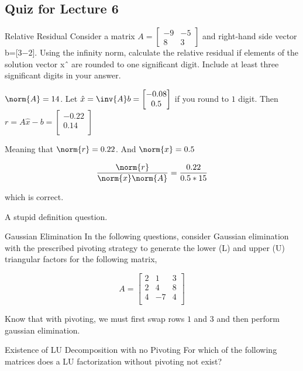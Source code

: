\documentclass[../main.tex]{subfiles}
\begin{document}
\subsection{Quiz for Lecture 6}
Relative Residual
Consider a matrix $A=\begin{bmatrix} −9 & -5 \\ 8 & 3 \end{bmatrix}$ and right-hand side vector b=[3−2]. Using the infinity norm, calculate the relative residual if elements of the solution vector xˆ are rounded to one significant digit. Include at least three significant digits in your answer.

\begin{solution}
    $\norm{A} = 14$. Let $\hat{x} = \inv{A}b = \begin{bmatrix}
        -0.08 \\ 0.5
    \end{bmatrix}$ if you round to $1$ digit. Then $r = A\hat{x} - b = \begin{bmatrix}
        -0.22 \\
        0.14 \\
    \end{bmatrix}$

    Meaning that $\norm{r} = 0.22$. And $\norm{x} = 0.5$

    \[
        \frac{\norm{r}}{\norm{x}\norm{A}} = \frac{0.22}{0.5 * 15}
    \]

    which is correct.
\end{solution}


A stupid definition question.

Gaussian Elimination
In the following questions, consider Gaussian elimination with the prescribed pivoting strategy to generate the lower (L) and upper (U) triangular factors for the following matrix,

\[
    A = \begin{bmatrix}
       2 & 1 & 3 \\
       2 & 4 & 8 \\
       4 & -7 & 4 \\
    \end{bmatrix}
\]

Know that with pivoting, we must first swap rows $1$ and $3$ and then perform gaussian elimination.


Existence of LU Decomposition with no Pivoting
For which of the following matrices does a LU factorization without pivoting not exist?
\end{document}
